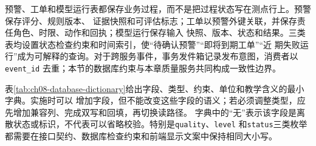 预警、工单和模型运行表都保存业务过程，而不是把过程状态写在测点行上。预警保存评分、规则版本、
证据快照和可评估标志；工单以预警外键关联，并保存责任角色、时限、动作和回执；模型运行保存输入
快照、版本、状态和结果。三类表均设置状态检查约束和时间索引，使“待确认预警”“即将到期工单”“近
期失败运行”成为可解释的查询。对于跨服务事件，事务发件箱记录发布意图，消费者以\texttt{event\_id}
去重；本节的数据库约束与本章质量服务共同构成一致性边界。

表\ref{tab:ch08-database-dictionary}给出字段、类型、约束、单位和教学含义的最小字典。实施时可以
增加字段，但不能改变这些字段的语义；若必须调整类型，应先增加兼容列、完成双写和回填，再切换读路径。
字典中的“无”表示该字段是离散状态或标识，不代表可以省略校验。特别是\texttt{quality}、\texttt{level}
和\texttt{status}三类枚举都需要在接口契约、数据库检查约束和前端显示文案中保持相同大小写。

